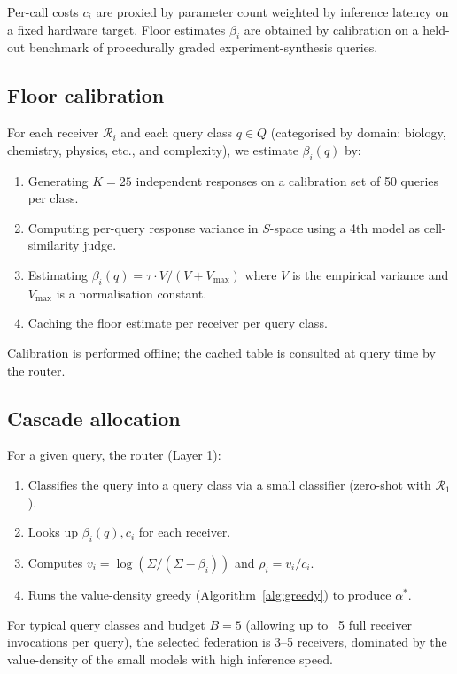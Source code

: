 \documentclass[11pt,twocolumn,a4paper]{article}
\theoremstyle{definition}
\theoremstyle{remark}
\newcommand{\receiver}{\mathcal{R}}
\newcommand{\Sigmax}{\Sigma}
\newcommand{\Sscalar}{S}
\begin{document}
Per-call costs $c_i$ are proxied by parameter count weighted by inference latency on a fixed hardware target. Floor estimates $\beta_i$ are obtained by calibration on a held-out benchmark of procedurally graded experiment-synthesis queries.

\subsection{Floor calibration}

For each receiver $\receiver_i$ and each query class $q \in Q$ (categorised by domain: biology, chemistry, physics, etc., and complexity), we estimate $\beta_i(q)$ by:

\begin{enumerate}[leftmargin=*,nosep]
\item Generating $K = 25$ independent responses on a calibration set of 50 queries per class.
\item Computing per-query response variance in $\Sscalar$-space using a 4th model as cell-similarity judge.
\item Estimating $\beta_i(q) = \tau \cdot V/(V + V_{\max})$ where $V$ is the empirical variance and $V_{\max}$ is a normalisation constant.
\item Caching the floor estimate per receiver per query class.
\end{enumerate}

Calibration is performed offline; the cached table is consulted at query time by the router.

\subsection{Cascade allocation}

For a given query, the router (Layer 1):

\begin{enumerate}[leftmargin=*,nosep]
\item Classifies the query into a query class via a small classifier (zero-shot with $\receiver_1$).
\item Looks up $\beta_i(q), c_i$ for each receiver.
\item Computes $v_i = \log(\Sigmax/(\Sigmax - \beta_i))$ and $\rho_i = v_i/c_i$.
\item Runs the value-density greedy (Algorithm~\ref{alg:greedy}) to produce $\alpha^*$.
\end{enumerate}

For typical query classes and budget $B = 5$ (allowing up to ~5 full receiver invocations per query), the selected federation is 3--5 receivers, dominated by the value-density of the small models with high inference speed.
\end{document}
